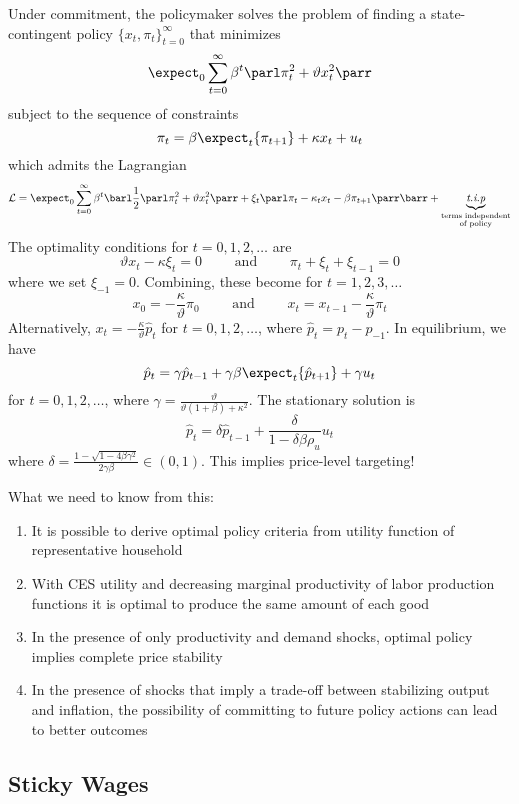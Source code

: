 \documentclass[10pt]{article}
\begin{document}
Under commitment, the policymaker solves the problem of finding a state-contingent policy $\{x_t,\pi_t\}_{t=0}^\infty$ that minimizes\[\expect_0 \sum_{t=0}^\infty \beta^t \parl \pi_t^2 + \vartheta x_t^2\parr\]subject to the sequence of constraints \[\pi_t = \beta \expect_t\{\pi_{t+1}\} + \kappa x_t + u_t\]which admits the Lagrangian \[\mathcal{L} = \expect_0 \sum_{t=0}^\infty \beta^t \barl \frac{1}{2}\parl\pi_t^2 +\vartheta x_t^2\parr + \xi_t \parl \pi_t - \kappa_t x_t- \beta\pi_{t+1}\parr\barr + \underbrace{\textit{t.i.p}}_{\substack{\text{terms independent} \\\text{of policy}}}\]The optimality conditions for $t = 0,1,2,\dots$ are \[\vartheta x_t - \kappa \xi_t = 0 \qquad \text{ and } \qquad \pi_t + \xi_t + \xi_{t-1}=0\]where we set $\xi_{-1}=0$. Combining, these become for $t = 1,2,3,\dots$ \[x_0 = -\frac{\kappa}{\vartheta} \pi_0\qquad \text{ and } \qquad x_t = x_{t-1} - \frac{\kappa}{\vartheta}\pi_t\]Alternatively, $x_t = - \frac{\kappa}{\vartheta}\hat{p}_t$ for $t = 0,1,2,\dots$, where $\hat{p}_t = p_t - p_{-1}$. In equilibrium, we have \[\hat{p}_t = \gamma \hat{p}_{t-1}+\gamma\beta \expect_t\{\hat{p}_{t+1}\}+\gamma u_t\]for $t=0,1,2,\dots$, where $\gamma = \frac{\vartheta}{\vartheta(1+\beta) +\kappa^2}$. The stationary solution is \[\hat{p}_t = \delta \hat{p}_{t-1} + \frac{\delta}{1-\delta \beta\rho_u} u_t\]where $\delta = \frac{1-\sqrt{1 - 4\beta\gamma^2}}{2\gamma\beta}\in (0,1)$. This implies price-level targeting!



\begin{remark}
	What we need to know from this:
	\begin{enumerate}
		\item It is possible to derive optimal policy criteria from utility function of representative household
		\item With CES utility and decreasing marginal productivity of labor production functions it is optimal to produce the same amount of each good
		\item In the presence of only productivity and demand shocks, optimal policy implies complete price stability
		\item In the presence of shocks that imply a trade-off between stabilizing output and inflation, the possibility of committing to future policy actions can lead to better outcomes
	\end{enumerate}
\end{remark}

\subsection{Sticky Wages}\label{subsec:8}
\end{document}
